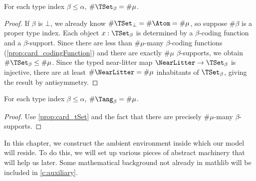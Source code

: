 \begin{proposition}
  \label{prop:card_tSet}
  For each type index \( \beta \leq \alpha \), \( \#\TSet_\beta = \#\mu \).
\end{proposition}
\begin{proof}
  If \( \beta \) is \( \bot \), we already know \( \#\TSet_\bot = \#\Atom = \#\mu \), so suppose \( \#\beta \) is a proper type index.
  Each object \( x : \TSet_\beta \) is determined by a \( \beta \)-coding function and a \( \beta \)-support.
  Since there are less than \( \#\mu \)-many \( \beta \)-coding functions (\cref{prop:card_codingFunction}) and there are exactly \( \#\mu \) \( \beta \)-supports, we obtain \( \#\TSet_\beta \leq \#\mu \).
  Since the typed near-litter map \( \NearLitter \to \TSet_\beta \) is injective, there are at least \( \#\NearLitter = \#\mu \) inhabitants of \( \TSet_\beta \), giving the result by antisymmetry.
\end{proof}
\begin{proposition}
  \label{prop:card_tangle}
  For each type index \( \beta \leq \alpha \), \( \#\Tang_\beta = \#\mu \).
\end{proposition}
\begin{proof}
  Use \cref{prop:card_tSet} and the fact that there are precisely \( \#\mu \)-many \( \beta \)-supports.
\end{proof}


In this chapter, we construct the ambient environment inside which our model will reside.
To do this, we will set up various pieces of abstract machinery that will help us later.
Some mathematical background not already in mathlib will be included in \cref{c:auxiliary}.


